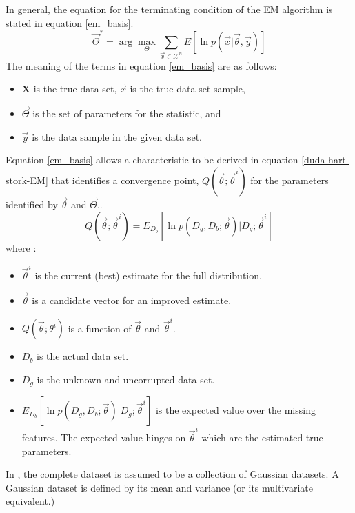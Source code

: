 \documentclass[]{article}
\begin{document}
In general, the equation for the terminating condition of the EM algorithm \cite{duda-hart-stork} is stated in equation \ref{em_basis}.  
\begin{equation}
\vec{\Theta}^* = \arg \max_{\Theta} \sum_{\vec{x}\in \mathcal{X}^n} E[ \ln p( \vec{x} | \vec{\theta} ,\vec{y}) ] \label{em_basis}
\end{equation}
The meaning of the terms in equation \ref{em_basis} are as follows:
\begin{itemize}
\item  $\mathbf{X}$ is the true data set, $\vec{x}$ is the true data set sample, 
 \item $\vec{\Theta}$ is the set of parameters for the statistic, and 
 \item $\vec{y}$ is the data sample in the given data set.
 \end{itemize}

Equation \ref{em_basis} allows a characteristic to be derived in equation \ref{duda-hart-stork-EM} that identifies a convergence point, $Q( \vec{\theta} ; \vec{\theta}^i)$ for the parameters identified by $\vec{\theta}$ and $\vec{\Theta}$,.
\begin{equation}
Q( \vec{\theta} ; \vec{\theta}^i) = E_{D_b} [ \ln p(D_g, D_b; \vec{\theta}) | D_g ; \vec{\theta}^i ] \label{duda-hart-stork-EM}
\end{equation}
where :
\begin{itemize}
	\item $\vec{\theta}^i$ is the current (best) estimate for the full distribution.  
	\item $\vec{\theta}$ is a candidate vector for an improved estimate.
	\item $Q(\vec{\theta} ; \theta^i)$ is a function of $\vec{\theta}$ and $\vec{\theta}^i$.
	\item $D_b$ is the actual data set.  
	\item $D_g$ is the unknown and uncorrupted data set.
	\item $E_{D_b} [ \ln p(D_g, D_b; \vec{\theta}) | D_g ; \vec{\theta}^i ] $ is the expected value over the missing features.  The expected value hinges on $\vec{\theta}^i$ which are the estimated true parameters.
\end{itemize}

 In \cite{yamazaki98introduction}, the complete dataset is assumed to be a collection of Gaussian datasets.   A Gaussian dataset is defined by its mean and variance (or its multivariate equivalent.)  
\end{document}
